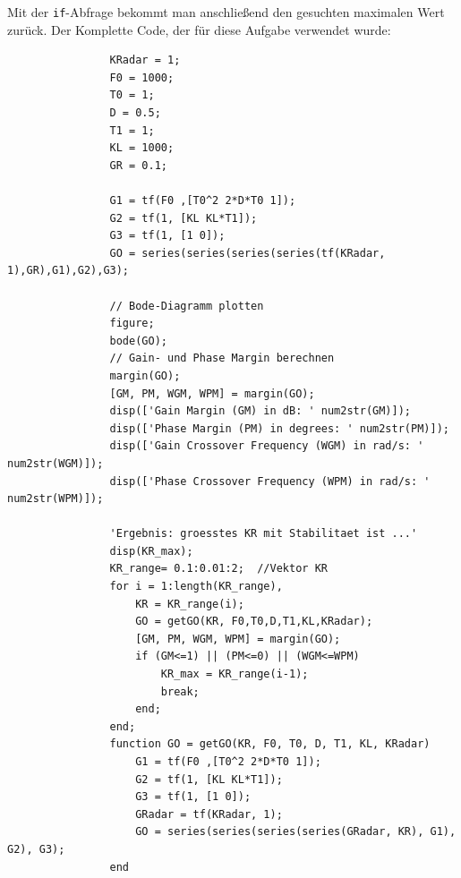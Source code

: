 \documentclass{article}
\begin{document}
			Mit der \lstinline{if}-Abfrage bekommt man anschließend den gesuchten maximalen Wert zurück.
\newpage
			Der Komplette Code, der für diese Aufgabe verwendet wurde:
			\begin{lstlisting}
				KRadar = 1;
				F0 = 1000;
				T0 = 1;
				D = 0.5;
				T1 = 1;
				KL = 1000;
				GR = 0.1;

				G1 = tf(F0 ,[T0^2 2*D*T0 1]);
				G2 = tf(1, [KL KL*T1]);
				G3 = tf(1, [1 0]);
				GO = series(series(series(series(tf(KRadar, 1),GR),G1),G2),G3);

				// Bode-Diagramm plotten
				figure;
				bode(GO);
				// Gain- und Phase Margin berechnen
				margin(GO);
				[GM, PM, WGM, WPM] = margin(GO);
				disp(['Gain Margin (GM) in dB: ' num2str(GM)]);
				disp(['Phase Margin (PM) in degrees: ' num2str(PM)]);
				disp(['Gain Crossover Frequency (WGM) in rad/s: ' num2str(WGM)]);
				disp(['Phase Crossover Frequency (WPM) in rad/s: ' num2str(WPM)]);
		
				'Ergebnis: groesstes KR mit Stabilitaet ist ...'
				disp(KR_max);
				KR_range= 0.1:0.01:2;  //Vektor KR
				for i = 1:length(KR_range),
				    KR = KR_range(i);
				    GO = getGO(KR, F0,T0,D,T1,KL,KRadar);
				    [GM, PM, WGM, WPM] = margin(GO);
				    if (GM<=1) || (PM<=0) || (WGM<=WPM)
				        KR_max = KR_range(i-1);
				        break;
				    end;
				end;
				function GO = getGO(KR, F0, T0, D, T1, KL, KRadar)
				    G1 = tf(F0 ,[T0^2 2*D*T0 1]);
				    G2 = tf(1, [KL KL*T1]);
				    G3 = tf(1, [1 0]);
				    GRadar = tf(KRadar, 1);
				    GO = series(series(series(series(GRadar, KR), G1), G2), G3);
				end
			\end{lstlisting}
\newpage
\end{document}

